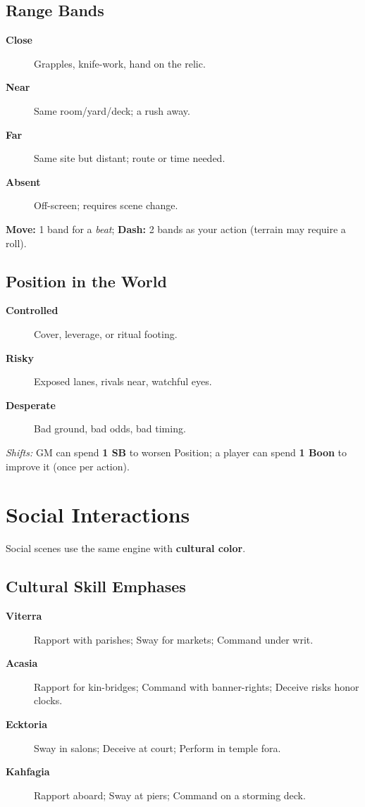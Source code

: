 \begin{multicols}{2}
\subsection*{Range Bands}
\begin{description}
  \item[\textbf{Close}] Grapples, knife-work, hand on the relic.
  \item[\textbf{Near}] Same room/yard/deck; a rush away.
  \item[\textbf{Far}] Same site but distant; route or time needed.
  \item[\textbf{Absent}] Off-screen; requires scene change.
\end{description}
\textbf{Move:} 1 band for a \emph{beat}; \textbf{Dash:} 2 bands as your action (terrain may require a roll).

\subsection*{Position in the World}
\begin{description}
  \item[\textbf{Controlled}] Cover, leverage, or ritual footing.
  \item[\textbf{Risky}] Exposed lanes, rivals near, watchful eyes.
  \item[\textbf{Desperate}] Bad ground, bad odds, bad timing.
\end{description}
\emph{Shifts:} GM can spend \textbf{1 SB} to worsen Position; a player can spend \textbf{1 Boon} to improve it (once per action).

\section{Social Interactions}
Social scenes use the same engine with \textbf{cultural color}.

\subsection*{Cultural Skill Emphases}
\begin{description}
  \item[\textbf{Viterra}]  Rapport with parishes; Sway for markets; Command under writ.
  \item[\textbf{Acasia}]  Rapport for kin-bridges; Command with banner-rights; Deceive risks honor clocks.
  \item[\textbf{Ecktoria}]  Sway in salons; Deceive at court; Perform in temple fora.
  \item[\textbf{Kahfagia}]  Rapport aboard; Sway at piers; Command on a storming deck.
\end{description}


\end{multicols}
